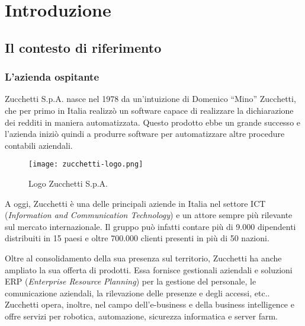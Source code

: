 \chapter{Introduzione}
\label{cap:introduzione}

\section{Il contesto di riferimento}
\subsection{L'azienda ospitante}
Zucchetti S.p.A. nasce nel 1978 da un'intuizione di Domenico ``Mino'' Zucchetti, 
che per primo in Italia realizzò un software capace di realizzare la dichiarazione
dei redditi in maniera automatizzata.
Questo prodotto ebbe un grande successo e l'azienda iniziò quindi a produrre
software per automatizzare altre procedure contabili aziendali.

\begin{figure}[h!] 
    \centering 
    \texttt{[image: zucchetti-logo.png]} 
    \caption{Logo Zucchetti S.p.A.}
\end{figure}

\noindent A oggi, Zucchetti è una delle principali aziende in Italia nel settore ICT 
(\emph{Information and Communication Technology}) e un attore sempre 
più rilevante sul mercato internazionale.
Il gruppo può infatti contare più di 9.000 dipendenti distribuiti in 15 paesi 
e oltre 700.000 clienti presenti in più di 50 nazioni.

Oltre al consolidamento della sua presenza sul territorio, Zucchetti ha anche 
ampliato la sua offerta di prodotti.
Essa fornisce gestionali aziendali e soluzioni ERP (\emph{Enterprise Resource Planning})
per la gestione del personale, le comunicazione aziendali, la rilevazione delle 
presenze e degli accessi, etc.. 
Zucchetti opera, inoltre, nel campo dell'e-business e della business intelligence e
offre servizi per robotica, automazione, sicurezza informatica e server farm.

